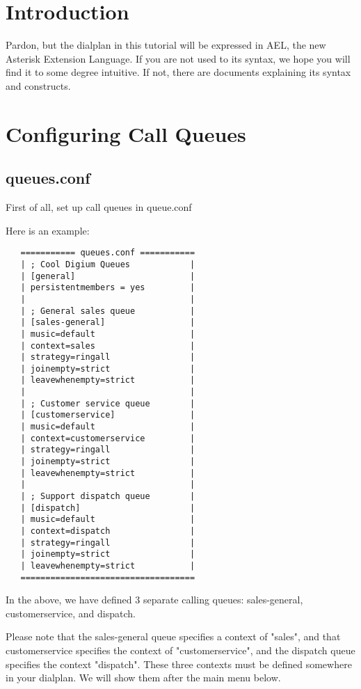 
\section{Introduction}

Pardon, but the dialplan in this tutorial will be expressed
in AEL, the new Asterisk Extension Language. If you are 
not used to its syntax, we hope you will find it to some
degree intuitive. If not, there are documents explaining
its syntax and constructs.


\section{Configuring Call Queues}

\subsection{queues.conf}
First of all, set up call queues in queue.conf

Here is an example:

\begin{verbatim}
   =========== queues.conf ===========
   | ; Cool Digium Queues            |
   | [general]                       |
   | persistentmembers = yes         |
   |                                 |
   | ; General sales queue           |
   | [sales-general]                 |
   | music=default                   |
   | context=sales                   |
   | strategy=ringall                |
   | joinempty=strict                |
   | leavewhenempty=strict           |
   |                                 |
   | ; Customer service queue        |
   | [customerservice]               |
   | music=default                   |
   | context=customerservice         |
   | strategy=ringall                |
   | joinempty=strict                |
   | leavewhenempty=strict           |
   |                                 |
   | ; Support dispatch queue        |
   | [dispatch]                      |
   | music=default                   |
   | context=dispatch                |
   | strategy=ringall                |
   | joinempty=strict                |
   | leavewhenempty=strict           |
   ===================================
\end{verbatim}

In the above, we have defined 3 separate calling queues: 
sales-general, customerservice, and dispatch.

Please note that the sales-general queue specifies a
context of "sales", and that customerservice specifies the
context of "customerservice", and the dispatch
queue specifies the context "dispatch". These three
contexts must be defined somewhere in your dialplan.
We will show them after the main menu below.

